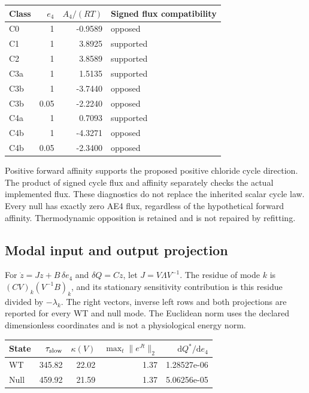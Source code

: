\begin{center}\begin{tabular}{lrrl}\hline Class & $e_4$ & $A_4/(RT)$ & Signed flux compatibility\\\hline

C0 & 1 & -0.9589 & opposed\\

C1 & 1 & 3.8925 & supported\\

C2 & 1 & 3.8589 & supported\\

C3a & 1 & 1.5135 & supported\\

C3b & 1 & -3.7440 & opposed\\

C3b & 0.05 & -2.2240 & opposed\\

C4a & 1 & 0.7093 & supported\\

C4b & 1 & -4.3271 & opposed\\

C4b & 0.05 & -2.3400 & opposed\\

\hline\end{tabular}\end{center}

Positive forward affinity supports the proposed positive chloride cycle direction. The product of signed cycle flux and affinity separately checks the actual implemented flux. These diagnostics do not replace the inherited scalar cycle law. Every null has exactly zero AE4 flux, regardless of the hypothetical forward affinity. Thermodynamic opposition is retained and is not repaired by refitting.

\subsection{Modal input and output projection}

For $\dot z=Jz+B\,\delta e_4$ and $\delta Q=Cz$, let $J=V\Lambda V^{-1}$. The residue of mode $k$ is $(CV)_k(V^{-1}B)_k$, and its stationary sensitivity contribution is this residue divided by $-\lambda_k$. The right vectors, inverse left rows and both projections are reported for every WT and null mode. The Euclidean norm uses the declared dimensionless coordinates and is not a physiological energy norm.

\begin{center}\begin{tabular}{lrrrr}\hline State & $\tau_{\rm slow}$ & $\kappa(V)$ & $\max_t\|e^{Jt}\|_2$ & $\mathrm{d}Q^*/\mathrm{d}e_4$\\\hline

WT & 345.82 & 22.02 & 1.37 & 1.28527e-06\\

Null & 459.92 & 21.59 & 1.37 & 5.06256e-05\\

\hline\end{tabular}\end{center}

